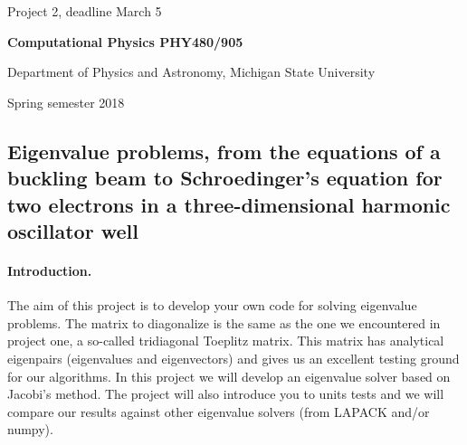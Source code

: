 \documentclass[%
oneside,                 %
final,                   %
10pt]{article}
\begin{document}

\newcommand{\exercisesection}[1]{\subsection*{#1}}






\thispagestyle{empty}

\begin{center}
{\LARGE\bf
\begin{spacing}{1.25}
Project 2, deadline March 5
\end{spacing}
}
\end{center}


\begin{center}
{\bf Computational Physics PHY480/905}
\end{center}

    \begin{center}
\centerline{{\small Department of Physics and Astronomy, Michigan State University}}
\end{center}
    

\begin{center}
Spring semester 2018
\end{center}

\vspace{1cm}


\subsection*{Eigenvalue problems, from the equations of a buckling beam to Schroedinger's equation for two electrons in a three-dimensional harmonic oscillator well}

\paragraph{Introduction.}
The aim of this project is to develop your own code for solving eigenvalue problems. The matrix to diagonalize is the same as the one we encountered in project one, a so-called tridiagonal Toeplitz matrix. This matrix has analytical eigenpairs (eigenvalues and eigenvectors) and gives us an excellent testing ground for our algorithms. In this project we will develop an eigenvalue solver based on Jacobi's method. The project will also introduce you to units tests and we will compare our results against other eigenvalue solvers (from LAPACK and/or numpy). 
\end{document}
